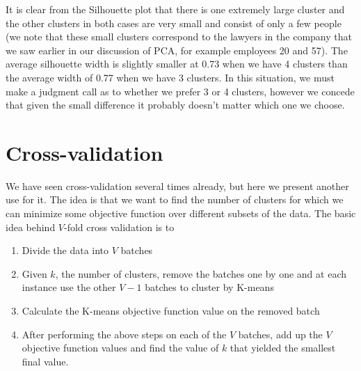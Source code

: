 It is clear from the Silhouette plot that there is one extremely large cluster and the other clusters in both cases are very small and consist of only a few people (we note that these small clusters correspond to the lawyers in the company that we saw earlier in our discussion of PCA, for example employees 20 and 57). The average silhouette width is slightly smaller at 0.73 when we have 4 clusters than the average width of 0.77 when we have 3 clusters. In this situation, we must make a judgment call as to whether we prefer 3 or 4 clusters, however we concede that given the small difference it probably doesn't matter which one we choose.


\section{Cross-validation}

We have seen cross-validation several times already, but here we present another use for it. The idea is that we want to find the number of clusters for which we can minimize some objective function over different subsets of the data. The basic idea behind $V$-fold cross validation is to


\begin{enumerate}
\item Divide the data into $V$ batches
\item Given $k$, the number of clusters, remove the batches one by one and at each instance use the other $V-1$ batches to cluster by K-means
\item Calculate the K-means objective function value on the removed batch 
\item After performing the above steps on each of the $V$ batches, add up the $V$ objective function values and find the value of $k$ that yielded the smallest final value.
\end{enumerate}
